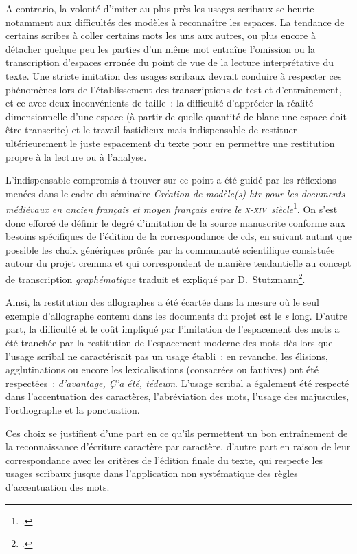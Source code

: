 \documentclass[a4paper,12pt,twoside]{book}
\newcommand{\siecle}[1]{\textsc{#1}\ieme}
\begin{document}
				A contrario, la volonté d'imiter au plus près les usages scribaux se heurte notamment aux difficultés des modèles à reconnaître les espaces. La tendance de certains scribes à coller certains mots les uns aux autres, ou plus encore à détacher quelque peu les parties d'un même mot entraîne l'omission ou la transcription d'espaces erronée du point de vue de la lecture interprétative du texte. Une stricte imitation des usages scribaux devrait conduire à respecter ces phénomènes lors de l'établissement des transcriptions de test et d'entraînement, et ce avec deux inconvénients de taille~: la difficulté d'apprécier la réalité dimensionnelle d'une espace (à partir de quelle quantité de blanc une espace doit être transcrite) et le travail fastidieux mais indispensable de restituer ultérieurement le juste espacement du texte pour en permettre une restitution propre à la lecture ou à l'analyse.
				
				L'indispensable compromis à trouver sur ce point a été guidé par les réflexions menées dans le cadre du séminaire \textit{Création de modèle(s) \gls{htr} pour les documents médiévaux en ancien français et moyen français entre le \siecle{x}-\siecle{xiv}~siècle}\footcite{pincheSeminaireCreationModele2021b}. On s'est donc efforcé de définir le degré d'imitation de la source manuscrite conforme aux besoins spécifiques de l'édition de la correspondance de \gls{cds}, en suivant autant que possible les choix génériques prônés par la communauté scientifique consistuée autour du projet \gls{cremma} et qui correspondent de manière tendantielle au concept de transcription \textit{graphématique} traduit et expliqué par D.~Stutzmann\footcite[p.~251]{stutzmannPaleographieStatistiquePour2011a}.
				
				Ainsi, la restitution des allographes a été écartée dans la mesure où le seul exemple d'allographe contenu dans les documents du projet est le \textit{s} long. D'autre part, la difficulté et le coût impliqué par l'imitation de l'espacement des mots a été tranchée par la restitution de l'espacement moderne des mots dès lors que l'usage scribal ne caractérisait pas un usage établi~; en revanche, les élisions, agglutinations ou encore les lexicalisations (consacrées ou fautives) ont été respectées~: \textit{d'avantage, Ç'a été, tédeum}. L'usage scribal a également été respecté dans l'accentuation des caractères, l'abréviation des mots, l'usage des majuscules, l'orthographe et la ponctuation.
				
				Ces choix se justifient d'une part en ce qu'ils permettent un bon entraînement de la reconnaissance d'écriture caractère par caractère, d'autre part en raison de leur correspondance avec les critères de l'édition finale du texte, qui respecte les usages scribaux jusque dans l'application non systématique des règles d'accentuation des mots.
				
\end{document}
